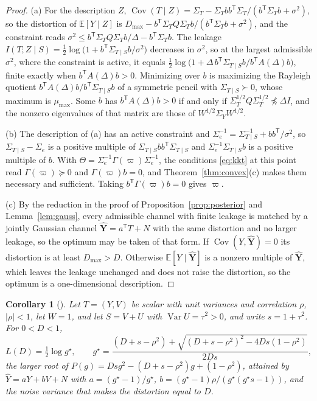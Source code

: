 \documentclass[11pt,onecolumn]{IEEEtran}
\newtheorem{corollary}[theorem]{Corollary}
\newcommand{\E}{\mathbb{E}}
\newcommand{\Cov}{\operatorname{Cov}}
\newcommand{\Var}{\operatorname{Var}}
\newcommand{\hY}{\hat{\mathbf Y}}
\newcommand{\Se}{\Sigma_{e}}
\newcommand{\Kc}{\Sigma_{T\mid S}}
\begin{document}
\begin{proof}
(a) For the description $Z$,
$\Cov(T\mid Z)=\Sigma_T-\Sigma_Tbb^{\mathsf T}\Sigma_T/(b^{\mathsf T}\Sigma_Tb+\sigma^2)$,
so the distortion of $\E[Y\mid Z]$ is
$D_{\max}-b^{\mathsf T}\Sigma_TQ\Sigma_Tb/(b^{\mathsf T}\Sigma_Tb+\sigma^2)$,
and the constraint reads
$\sigma^2\le b^{\mathsf T}\Sigma_TQ\Sigma_Tb/\Delta-b^{\mathsf T}\Sigma_Tb$.
The leakage
$I(T;Z\mid S)=\tfrac12\log\bigl(1+b^{\mathsf T}\Kc b/\sigma^2\bigr)$
decreases in $\sigma^2$, so at the largest admissible $\sigma^2$, where
the constraint is active, it equals
$\tfrac12\log\bigl(1+\Delta\,b^{\mathsf T}\Kc b/b^{\mathsf T}A(\Delta)b\bigr)$,
finite exactly when $b^{\mathsf T}A(\Delta)b>0$. Minimizing over $b$ is
maximizing the Rayleigh quotient $b^{\mathsf T}A(\Delta)b/b^{\mathsf T}\Kc b$
of a symmetric pencil with $\Kc\succ0$, whose maximum is $\mu_{\max}$.
Some $b$ has $b^{\mathsf T}A(\Delta)b>0$ if and only if
$\Sigma_T^{1/2}Q\Sigma_T^{1/2}\not\preceq\Delta I$, and the nonzero
eigenvalues of that matrix are those of $W^{1/2}\Sigma_YW^{1/2}$.

(b) The description of (a) has an active constraint and
$\Se^{-1}=\Kc^{-1}+bb^{\mathsf T}/\sigma^2$, so $\Kc-\Se$ is a positive
multiple of $\Kc bb^{\mathsf T}\Kc$ and $\Se^{-1}\Kc b$ is a positive
multiple of $b$. With $\Theta=\Se^{-1}\Gamma(\varpi)\Se^{-1}$, the
conditions \eqref{eq:kkt} at this point read $\Gamma(\varpi)\succeq0$ and
$\Gamma(\varpi)b=0$, and Theorem~\ref{thm:convex}(c) makes them necessary
and sufficient. Taking $b^{\mathsf T}\Gamma(\varpi)b=0$ gives $\varpi$.

(c) By the reduction in the proof of Proposition~\ref{prop:posterior}
and Lemma~\ref{lem:gauss}, every admissible channel with finite leakage
is matched by a jointly Gaussian channel $\hY=a^{\mathsf T}T+N$ with the
same distortion and no larger leakage, so the optimum may be taken of
that form. If $\Cov(Y,\hY)=0$ its
distortion is at least $D_{\max}>D$. Otherwise $\E[Y\mid\hY]$ is a
nonzero multiple of $\hY$, which leaves the leakage unchanged and does
not raise the distortion, so the optimum is a one-dimensional
description.
\end{proof}

\begin{corollary}[{\cite{bond2026cr}}]\label{cor:scalar}
Let $T=(Y,V)$ be scalar with unit variances and correlation $\rho$,
$|\rho|<1$, let $W=1$, and let $S=V+U$ with $\Var U=\tau^2>0$, and write
$s=1+\tau^2$. For $0<D<1$,
\[
L(D)=\tfrac12\log g^\star,\qquad
g^\star=\frac{(D+s-\rho^2)+\sqrt{(D+s-\rho^2)^2-4Ds(1-\rho^2)}}{2Ds},
\]
the larger root of $P(g)=Dsg^2-(D+s-\rho^2)g+(1-\rho^2)$, attained by
$\hat Y=aY+bV+N$ with $a=(g^\star-1)/g^\star$,
$b=(g^\star-1)\rho/(g^\star(g^\star s-1))$, and the noise variance that makes
the distortion equal to $D$.
\end{corollary}
\end{document}
